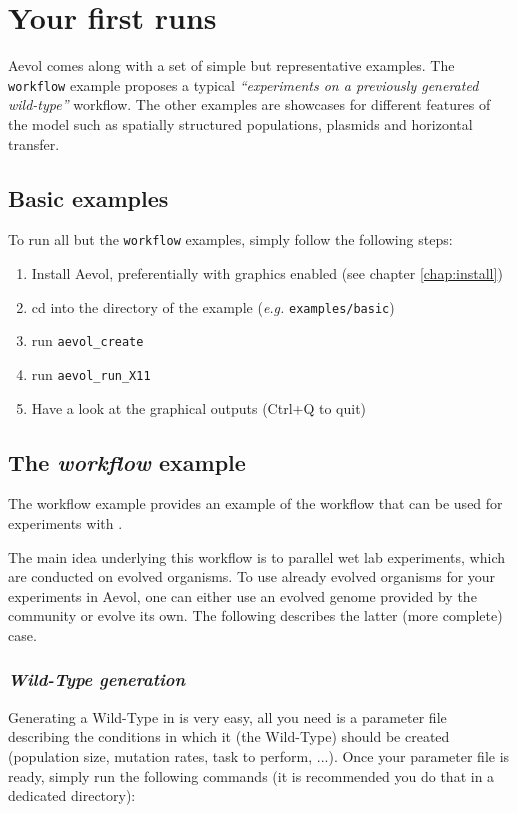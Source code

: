 \chapter{Your first \aevol{} runs}
\label{chap:first-runs}


\vspace{5mm}

Aevol comes along with a set of simple but representative examples. The \verb?workflow? example proposes a typical \emph{``experiments on a previously generated wild-type''} workflow. The other examples are showcases for different features of the model such as spatially structured populations, plasmids and horizontal transfer.


\section{Basic examples}

To run all but the \verb?workflow? examples, simply follow the following steps:

\begin{enumerate}
\item Install Aevol, preferentially with graphics enabled (see chapter \ref{chap:install})
\item cd into the directory of the example (\emph{e.g.} \verb?examples/basic?)
\item
run \verb?aevol_create?
\item
run \verb?aevol_run_X11?
\item Have a look at the graphical outputs (Ctrl+Q to quit)
\end{enumerate}


\section{The \emph{workflow} example}

The workflow example provides an example of the workflow that can be used for experiments with \aevol{}.

The main idea underlying this workflow is to parallel wet lab experiments, which are conducted on evolved organisms.
To use already evolved organisms for your experiments in Aevol, one can either use an evolved genome provided by the community or evolve its own. The following describes the latter (more complete) case.


\subsection{\emph{Wild-Type generation}}
Generating a Wild-Type in \aevol{} is very easy, all you need is a parameter file describing the conditions in which it (the Wild-Type) should be created (population size, mutation rates, task to perform, ...). Once your parameter file is ready, simply run the following commands (it is recommended you do that in a dedicated directory):

